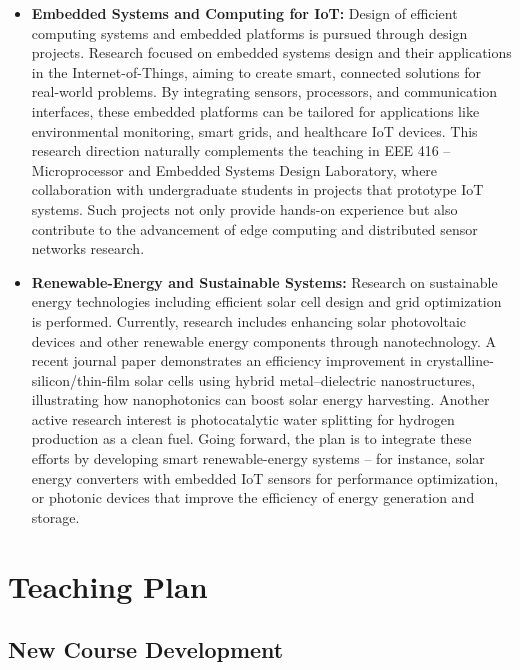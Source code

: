 \documentclass[cvauthor={Dr. Sajid Muhaimin Choudhury}]{buetcv}
\begin{document}
\begin{itemize}
    \item \textbf{Embedded Systems and Computing for IoT:} Design of efficient computing systems and embedded platforms is pursued through design projects. Research focused on embedded systems design and their applications in the Internet-of-Things, aiming to create smart, connected solutions for real-world problems. By integrating sensors, processors, and communication interfaces, these embedded platforms can be tailored for applications like environmental monitoring, smart grids, and healthcare IoT devices. This research direction naturally complements the teaching in EEE 416 – Microprocessor and Embedded Systems Design Laboratory, where collaboration with undergraduate students in projects that prototype IoT systems. Such projects not only provide hands-on experience but also contribute to the advancement of edge computing and distributed sensor networks research.
    \item \textbf{Renewable-Energy and Sustainable Systems:} Research on sustainable energy technologies including efficient solar cell design and grid optimization is performed. Currently, research includes enhancing solar photovoltaic devices and other renewable energy components through nanotechnology. A recent journal paper demonstrates an efficiency improvement in crystalline-silicon/thin-film solar cells using hybrid metal–dielectric nanostructures, illustrating how nanophotonics can boost solar energy harvesting. Another active research interest is photocatalytic water splitting for hydrogen production as a clean fuel. Going forward, the plan is to integrate these efforts by developing smart renewable-energy systems – for instance, solar energy converters with embedded IoT sensors for performance optimization, or photonic devices that improve the efficiency of energy generation and storage. 
\end{itemize}

\section{Teaching Plan}
\subsection{New Course Development}
\end{document}
